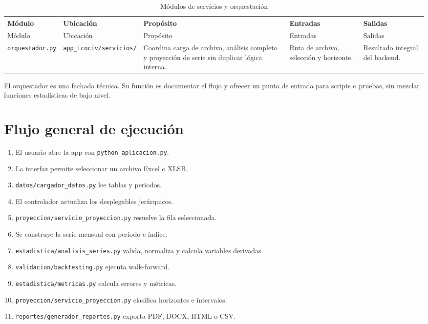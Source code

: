 \documentclass[12pt,letterpaper]{article}
\begin{document}
\begin{longtable}{p{}p{}p{}p{}p{}}
\caption{Módulos de servicios y orquestación}
\label{tab:modulos_servicios}\\
\toprule
Módulo & Ubicación & Propósito & Entradas & Salidas \\
\midrule
\endfirsthead
\toprule
Módulo & Ubicación & Propósito & Entradas & Salidas \\
\midrule
\endhead
\texttt{orquestador.py} & \texttt{app\_icociv/servicios/} & Coordina carga de archivo, análisis completo y proyección de serie sin duplicar lógica interna. & Ruta de archivo, selección y horizonte. & Resultado integral del backend. \\
\bottomrule
\end{longtable}

El orquestador es una fachada técnica. Su función es documentar el flujo y ofrecer un punto de entrada para scripts o pruebas, sin mezclar funciones estadísticas de bajo nivel.

\section{Flujo general de ejecución}

\begin{enumerate}[leftmargin=*]
    \item El usuario abre la app con \texttt{python aplicacion.py}.
    \item La interfaz permite seleccionar un archivo Excel o XLSB.
    \item \texttt{datos/cargador\_datos.py} lee tablas y periodos.
    \item El controlador actualiza los desplegables jerárquicos.
    \item \texttt{proyeccion/servicio\_proyeccion.py} resuelve la fila seleccionada.
    \item Se construye la serie mensual con periodo e índice.
    \item \texttt{estadistica/analisis\_series.py} valida, normaliza y calcula variables derivadas.
    \item \texttt{validacion/backtesting.py} ejecuta walk-forward.
    \item \texttt{estadistica/metricas.py} calcula errores y métricas.
    \item \texttt{proyeccion/servicio\_proyeccion.py} clasifica horizontes e intervalos.
    \item \texttt{reportes/generador\_reportes.py} exporta PDF, DOCX, HTML o CSV.
\end{enumerate}
\end{document}
